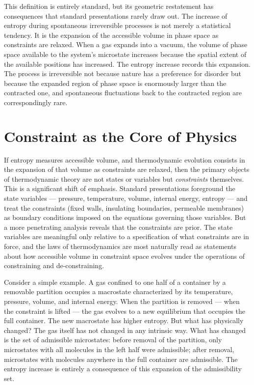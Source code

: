 \documentclass[12pt,openany]{book}
\theoremstyle{plain}
\theoremstyle{definition}
\theoremstyle{remark}
\begin{document}
This definition is entirely standard, but its geometric restatement has consequences that standard presentations rarely draw out. The increase of entropy during spontaneous irreversible processes is not merely a statistical tendency. It is the expansion of the accessible volume in phase space as constraints are relaxed. When a gas expands into a vacuum, the volume of phase space available to the system's microstate increases because the spatial extent of the available positions has increased. The entropy increase records this expansion. The process is irreversible not because nature has a preference for disorder but because the expanded region of phase space is enormously larger than the contracted one, and spontaneous fluctuations back to the contracted region are correspondingly rare.

\section{Constraint as the Core of Physics}

If entropy measures accessible volume, and thermodynamic evolution consists in the expansion of that volume as constraints are relaxed, then the primary objects of thermodynamic theory are not states or variables but \emph{constraints} themselves. This is a significant shift of emphasis. Standard presentations foreground the state variables — pressure, temperature, volume, internal energy, entropy — and treat the constraints (fixed walls, insulating boundaries, permeable membranes) as boundary conditions imposed on the equations governing those variables. But a more penetrating analysis reveals that the constraints are prior. The state variables are meaningful only relative to a specification of what constraints are in force, and the laws of thermodynamics are most naturally read as statements about how accessible volume in constraint space evolves under the operations of constraining and de-constraining.

Consider a simple example. A gas confined to one half of a container by a removable partition occupies a macrostate characterized by its temperature, pressure, volume, and internal energy. When the partition is removed — when the constraint is lifted — the gas evolves to a new equilibrium that occupies the full container. The new macrostate has higher entropy. But what has physically changed? The gas itself has not changed in any intrinsic way. What has changed is the set of admissible microstates: before removal of the partition, only microstates with all molecules in the left half were admissible; after removal, microstates with molecules anywhere in the full container are admissible. The entropy increase is entirely a consequence of this expansion of the admissibility set.
\end{document}
